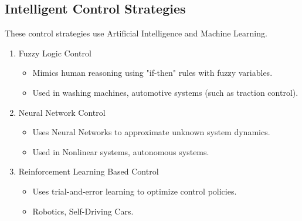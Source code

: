 \documentclass{article}
\begin{document}
\subsection{Intelligent Control Strategies}
These control strategies use Artificial Intelligence and Machine Learning.
\begin{enumerate}
    \item Fuzzy Logic Control
        \begin{itemize}
            \item Mimics human reasoning using "if-then" rules with fuzzy variables.
            \item Used in washing machines, automotive systems (such as traction control).
        \end{itemize}
    \item Neural Network Control
        \begin{itemize}
            \item Uses Neural Networks to approximate unknown system dynamics.
            \item Used in Nonlinear systems, autonomous systems.
        \end{itemize}
    \item Reinforcement Learning Based Control
        \begin{itemize}
            \item Uses trial-and-error learning to optimize control policies.
            \item Robotics, Self-Driving Cars.
        \end{itemize}
\end{enumerate}
\end{document}
